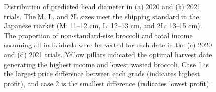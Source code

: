 \begin{figure}[htb]
  \begin{center}
  \end{center}
  \caption[Distribution of predicted head diameter in 2020 and 2021 trials]{
    Distribution of predicted head diameter in (a) 2020 and (b) 2021 trials. 
    The M, L, and 2L sizes meet the shipping standard in the Japanese market 
    (M: 11–12 cm, L: 12–13 cm, and 2L: 13–15 cm). The proportion of non-standard-size broccoli and total income assuming all individuals were harvested for each date in the (c) 2020 and (d) 2021 trials. 
    Yellow pillars indicated the optimal harvest date generating the highest income and lowest wasted broccoli. 
    Case 1 is the largest price difference between each grade (indicates highest profit), and case 2 is the smallest difference (indicates lowest profit).
  }
  \label{fig:bro3}
\end{figure}